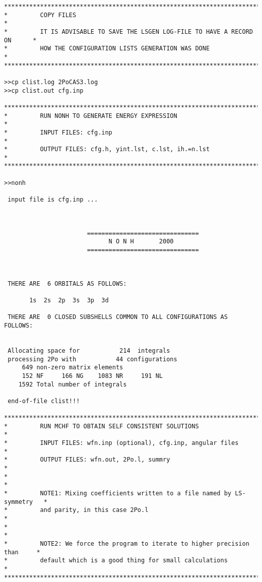 \documentclass[fleqn,10pt]{book}
\begin{document}
\begin{verbatim}
*******************************************************************************
*         COPY FILES                                                          *
*         IT IS ADVISABLE TO SAVE THE LSGEN LOG-FILE TO HAVE A RECORD ON      *
*         HOW THE CONFIGURATION LISTS GENERATION WAS DONE                     *
*******************************************************************************

>>cp clist.log 2PoCAS3.log
>>cp clist.out cfg.inp

*******************************************************************************
*         RUN NONH TO GENERATE ENERGY EXPRESSION                              *
*         INPUT FILES: cfg.inp                                                *
*         OUTPUT FILES: cfg.h, yint.lst, c.lst, ih.=n.lst                     *
*******************************************************************************

>>nonh

 input file is cfg.inp ...



                       ===============================
                             N O N H       2000
                       ===============================



 THERE ARE  6 ORBITALS AS FOLLOWS:

       1s  2s  2p  3s  3p  3d

 THERE ARE  0 CLOSED SUBSHELLS COMMON TO ALL CONFIGURATIONS AS FOLLOWS:


 Allocating space for           214  integrals
 processing 2Po with           44 configurations
     649 non-zero matrix elements
     152 NF     166 NG    1083 NR     191 NL
    1592 Total number of integrals

 end-of-file clist!!!

*******************************************************************************
*         RUN MCHF TO OBTAIN SELF CONSISTENT SOLUTIONS                        *
*         INPUT FILES: wfn.inp (optional), cfg.inp, angular files             *
*         OUTPUT FILES: wfn.out, 2Po.l, summry                                *
*                                                                             *
*         NOTE1: Mixing coefficients written to a file named by LS-symmetry   *
*         and parity, in this case 2Po.l                                      *
*                                                                             *
*         NOTE2: We force the program to iterate to higher precision than     *
*         default which is a good thing for small calculations                *
*******************************************************************************


\end{verbatim}
\end{document}
